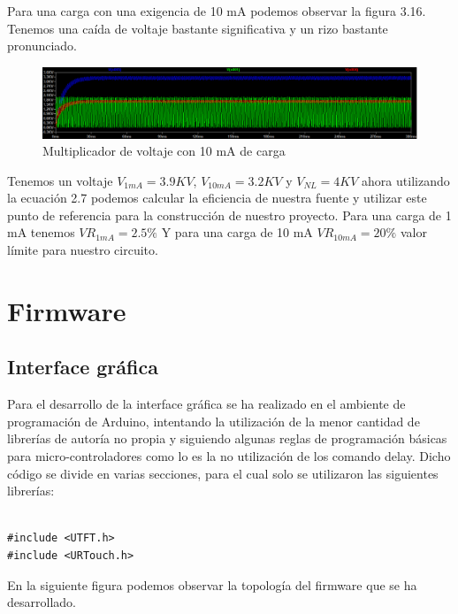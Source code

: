 Para una carga con una exigencia de 10 mA podemos observar la figura 3.16. Tenemos una caída de voltaje bastante significativa y un rizo bastante pronunciado.


\begin{figure}[H]
\centering
\includegraphics[width=12cm]{Capitulo3/figs/10ma.png}
\caption{Multiplicador de voltaje con 10 mA de carga}
\end{figure}

Tenemos un voltaje $V_{1mA}=3.9KV$, $V_{10mA}=3.2KV$ y $V_{NL}=4KV$ ahora utilizando la ecuación 2.7 podemos calcular la eficiencia de nuestra fuente y utilizar este punto de referencia para la construcción de nuestro proyecto. Para una carga de 1 mA tenemos $VR_{1mA}=2.5\%$ Y para una carga de 10 mA $VR_{10mA}=20\%$ valor límite para nuestro circuito.
\newpage

\section{Firmware}
\subsection{Interface gráfica}
Para el desarrollo de la interface gráfica se ha realizado en el ambiente de programación de Arduino, intentando la utilización de la menor cantidad de librerías de autoría no propia y siguiendo algunas reglas de programación básicas para micro-controladores como lo es la no utilización de los comando delay. Dicho código se divide en varias secciones, para el cual solo se utilizaron las siguientes librerías:

\begin{verbatim}

#include <UTFT.h>
#include <URTouch.h>

\end{verbatim}

En la siguiente figura podemos observar la topología del firmware que se ha desarrollado.\\

